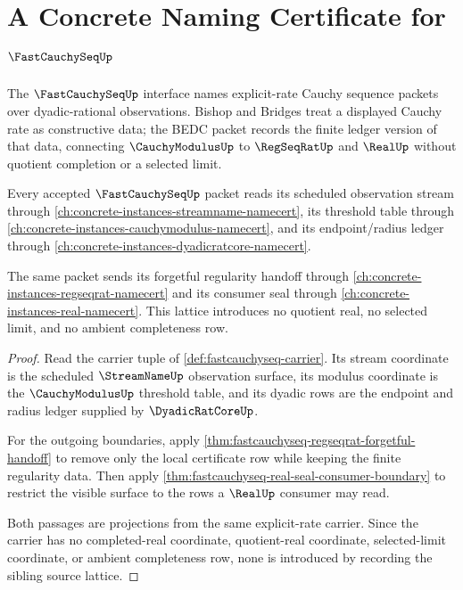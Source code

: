 \chapter{A Concrete Naming Certificate for $\FastCauchySeqUp$}
\label{ch:concrete-instances-fastcauchyseq-namecert}

The $\FastCauchySeqUp$ interface names explicit-rate Cauchy sequence packets over dyadic-rational observations. Bishop and Bridges treat a displayed Cauchy rate as constructive data; the BEDC packet records the finite ledger version of that data, connecting $\CauchyModulusUp$ to $\RegSeqRatUp$ and $\RealUp$ without quotient completion or a selected limit.

\begin{theorem}
\label{thm:fastcauchyseq-sibling-source-lattice}
Every accepted $\FastCauchySeqUp$ packet reads its scheduled observation stream through \autoref{ch:concrete-instances-streamname-namecert}, its threshold table through \autoref{ch:concrete-instances-cauchymodulus-namecert}, and its endpoint/radius ledger through \autoref{ch:concrete-instances-dyadicratcore-namecert}.

The same packet sends its forgetful regularity handoff through \autoref{ch:concrete-instances-regseqrat-namecert} and its consumer seal through \autoref{ch:concrete-instances-real-namecert}. This lattice introduces no quotient real, no selected limit, and no ambient completeness row.
\end{theorem}
\begin{proof}
Read the carrier tuple of \autoref{def:fastcauchyseq-carrier}. Its stream coordinate is the scheduled $\StreamNameUp$ observation surface, its modulus coordinate is the $\CauchyModulusUp$ threshold table, and its dyadic rows are the endpoint and radius ledger supplied by $\DyadicRatCoreUp$.

For the outgoing boundaries, apply \autoref{thm:fastcauchyseq-regseqrat-forgetful-handoff} to remove only the local certificate row while keeping the finite regularity data. Then apply \autoref{thm:fastcauchyseq-real-seal-consumer-boundary} to restrict the visible surface to the rows a $\RealUp$ consumer may read.

Both passages are projections from the same explicit-rate carrier. Since the carrier has no completed-real coordinate, quotient-real coordinate, selected-limit coordinate, or ambient completeness row, none is introduced by recording the sibling source lattice.
\end{proof}

